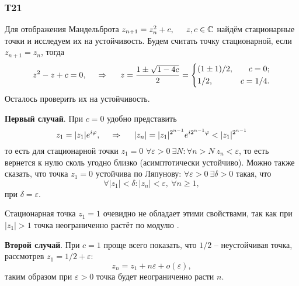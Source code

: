 \subsubsection*{Т21}

Для отображения Мандельброта 
$
    z_{n+1} = z_n^2 + c, \hspace{5 mm} z, c \in \mathbb{C}
$
найдём стационарные точки и исследуем их на устойчивость.
Будем считать точку стационарной, если $z_{n+1} = z_n$, тогда
\begin{equation*}
    z^2 - z + c = 0,
    \hspace{0.5cm} \Rightarrow \hspace{0.5cm}
    z = \frac{1 \pm \sqrt{1-4 c}}{2} = \left\{\begin{aligned}
        &(1 \pm 1)/2, &c=0; \\
        &1/2, & c={1}/{4}.
    \end{aligned}\right.
\end{equation*}
Осталось проверить их на устойчивость. 

\textbf{Первый случай}. При $c = 0$ удобно представить 
\begin{equation*}
    z_1 = |z_1| e^{i \varphi}, 
    \hspace{0.5cm} \Rightarrow \hspace{0.5cm}
    |z_n| = |z_1|^{2^{n-1}} e^{i 2^{n-1} \varphi} < |z_1|^{2^{n-1}}
\end{equation*}
то есть для стационарной точки $z_1 = 0$ $\forall \varepsilon > 0 \ \exists N \colon  \forall n > N \ z_n < \varepsilon$, то есть вернется к нулю сколь угодно близко (асимптотически устойчиво). Можно также сказать, что точка $z_1 = 0$ устойчива по Ляпунову: $\forall \varepsilon >  0 \ \exists \delta > 0$ такая, что 
\begin{equation*}
    \forall |z_1| < \delta\colon |z_n| < \varepsilon, \ \forall n \geq 1,
\end{equation*}
при $\delta = \varepsilon$.

Стационарная точка $z_1 = 1$ очевидно не обладает этими свойствами, так как при $|z_1|>1$ точка неограниченно растёт по модулю .



\textbf{Второй случай}. При $c = 1$ проще всего показать, что $1/2$ -- неустойчивая точка, рассмотрев $z_1 = 1/2 + \varepsilon$:
\begin{equation*}
    z_n = z_1 + n \varepsilon + o(\varepsilon),
\end{equation*}
таким образом при $\varepsilon > 0$ точка будет неограниченно расти $n$.
